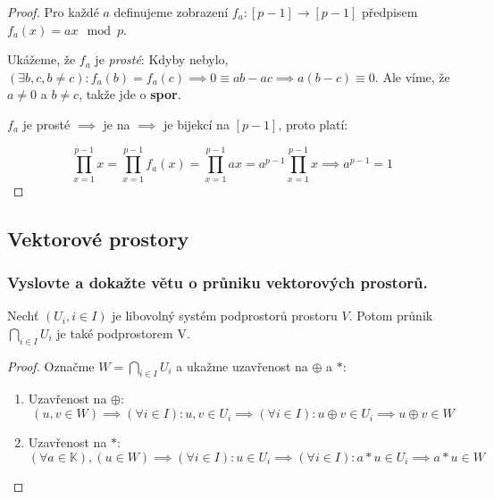 \documentclass[10pt,a4paper]{article}
\begin{document}
\begin{proof}

Pro každé $a$ definujeme zobrazení $f_a: [p-1] \to [p-1]$ předpisem $f_a(x) = ax \mod p$.

Ukážeme, že $f_a$ je \textit{prosté}: Kdyby nebylo, $(\exists b, c, b \neq c): f_a(b) = f_a(c) \implies 0 \equiv ab - ac \implies a(b-c) \equiv 0$. Ale víme, že $a \neq 0$ a $b \neq c$, takže jde o \textbf{spor}.

$f_a$ je prosté $\implies$ je na $\implies$ je bijekcí na $[p-1]$, proto platí:

\begin{equation*}
\prod_{x=1}^{p-1} x = \prod_{x=1}^{p-1} f_a(x) = \prod_{x=1}^{p-1} ax = a^{p-1} \prod_{x=1}^{p-1} x  \implies a^{p-1} = 1
\end{equation*}
\end{proof}

\subsection{Vektorové prostory}
\subsubsection{Vyslovte a dokažte větu o průniku vektorových prostorů.}

Nechť $(U_i, i \in I)$ je libovolný systém podprostorů prostoru $V$. Potom průnik $\displaystyle \bigcap_{i \in I}  U_i$ je také podprostorem V.

\begin{proof}
Označme $W = \displaystyle \bigcap_{i \in I} U_i$ a ukažme uzavřenost na $\oplus$ a $*$:

\begin{enumerate}
    \item Uzavřenost na $\oplus$:
        \begin{equation*}
            (u, v \in W) \implies (\forall i\in I): u,v \in U_i \implies (\forall i \in I): u\oplus v \in U_i \implies u\oplus v \in W
        \end{equation*}

    \item Uzavřenost na $*$:
        \begin{equation*}	
            (\forall a \in \mathbb{K}), (u \in W) \implies (\forall i \in I): u \in U_i \implies (\forall i \in I): a * u \in U_i \implies a * u \in W	
        \end{equation*}

\end{enumerate}

\end{proof}
\end{document}
